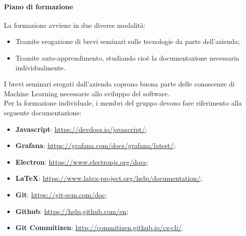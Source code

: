 \documentclass[../norme-di-progetto.tex]{subfiles}
\begin{document}
\paragraph{Piano di formazione}
La formazione avviene in due diverse modalità:
\begin{itemize}
  \item Tramite erogazione di brevi seminari sulle tecnologie da parte dell'azienda;
  \item Tramite auto-apprendimento, studiando cioè la documentazione necessaria individualmente.
\end{itemize}
I brevi seminari erogati dall'azienda coprono buona parte delle conoscenze di Machine Learning necessarie allo sviluppo del software. \\ Per la formazione individuale, i membri del gruppo devono fare riferimento alla seguente documentazione:
\begin{itemize}
  \item \textbf{Javascript}: \href{https://devdocs.io/javascript/}{https://devdocs.io/javascript/};
  \item \textbf{Grafana}: \href{https://grafana.com/docs/grafana/latest/}{https://grafana.com/docs/grafana/latest/};
  \item \textbf{Electron}: \href{https://www.electronjs.org/docs}{https://www.electronjs.org/docs};
  \item \textbf{\LaTeX}: \href{https://www.latex-project.org/help/documentation/}{https://www.latex-project.org/help/documentation/};
  \item \textbf{Git}: \href{https://git-scm.com/doc}{https://git-scm.com/doc};
  \item \textbf{Github}: \href{https://help.github.com/en}{https://help.github.com/en};
  \item \textbf{Git Commitizen}: \href{http://commitizen.github.io/cz-cli/}{http://commitizen.github.io/cz-cli/}.
\end{itemize}
\end{document}
